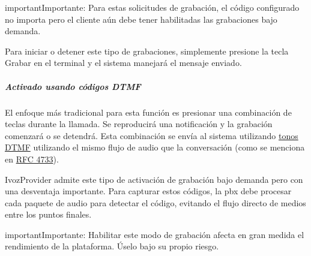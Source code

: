 \documentclass[letterpaper,10pt,spanish]{sphinxmanual}
\begin{document}
\begin{notice}{important}{Importante:}
Para estas solicitudes de grabación, el código configurado no importa pero el cliente aún debe tener habilitadas las grabaciones bajo demanda.
\end{notice}

Para iniciar o detener este tipo de grabaciones, simplemente presione la tecla Grabar en el terminal y el sistema manejará el mensaje enviado.


\subparagraph{Activado usando códigos \emph{DTMF}}
\label{administration_portal/client/vpbx/calls/call_recordings:activated-using-dtmf-codes}
El enfoque más tradicional para esta función es presionar una combinación de teclas durante la llamada. Se reproducirá una notificación y la grabación comenzará o se detendrá. Esta combinación se envía al sistema utilizando \href{https://es.wikipedia.org/wiki/Marcaci\%C3\%B3n\_por\_tonos}{tonos DTMF} utilizando el mismo flujo de audio que la conversación (como se menciona en \href{https://tools.ietf.org/html/rfc4733}{RFC 4733}).

IvozProvider admite este tipo de activación de grabación bajo demanda pero con una desventaja importante. Para capturar estos códigos, la pbx debe procesar cada paquete de audio para detectar el código, evitando el flujo directo de medios entre los puntos finales.

\begin{notice}{important}{Importante:}
Habilitar este modo de grabación afecta en gran medida el rendimiento de la plataforma. Úselo bajo su propio riesgo.
\end{notice}
\end{document}
